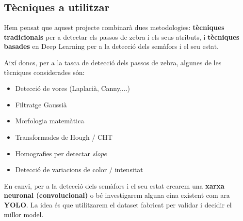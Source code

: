 \documentclass[10pt,a4paper,twocolumn,twoside]{article}
\begin{document}
\subsection{Tècniques a utilitzar}
 
 Hem pensat que aquest projecte combinarà dues metodologies: \textbf{tècniques tradicionals} per a detectar els passos de zebra i els seus atributs, i \textbf{tècniques basades} en Deep Learning per a la detecció dels semàfors i el seu estat.
 
 Així doncs, per a la tasca de detecció dels passos de zebra, algunes de les tècniques considerades són:
 \vspace{-0.3em}
 \begin{itemize}
 	\item Detecció de vores (Laplacià, Canny,...)
 	\item Filtratge Gaussià
 	\item Morfologia matemàtica
	\item Transformades de Hough / CHT
	\item Homografies per detectar \textit{slope}
	\item Detecció de variacions de color / intensitat
 \end{itemize}
 
 En canvi, per a la detecció dels semàfors i el seu estat crearem una \textbf{xarxa neuronal (convolucional)} o bé investigarem alguna eina existent com ara \textbf{YOLO}. La idea és que utilitzarem el dataset fabricat per validar i decidir el millor model.
 


\end{document}
